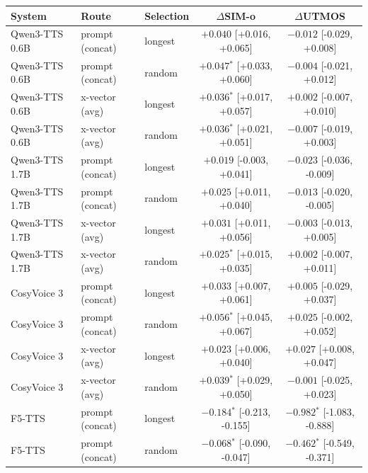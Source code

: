 \begin{tabular}{lllcc}
\toprule
\textbf{System} & \textbf{Route} & \textbf{Selection} & $\Delta$\textbf{SIM-o} & $\Delta$\textbf{UTMOS} \\
\midrule
Qwen3-TTS 0.6B & prompt (concat) & longest & $+0.040$ \scriptsize{[+0.016, +0.065]} & $-0.012$ \scriptsize{[-0.029, +0.008]} \\
Qwen3-TTS 0.6B & prompt (concat) & random & $+0.047$$^\ast$ \scriptsize{[+0.033, +0.060]} & $-0.004$ \scriptsize{[-0.021, +0.012]} \\
Qwen3-TTS 0.6B & x-vector (avg) & longest & $+0.036$$^\ast$ \scriptsize{[+0.017, +0.057]} & $+0.002$ \scriptsize{[-0.007, +0.010]} \\
Qwen3-TTS 0.6B & x-vector (avg) & random & $+0.036$$^\ast$ \scriptsize{[+0.021, +0.051]} & $-0.007$ \scriptsize{[-0.019, +0.003]} \\
Qwen3-TTS 1.7B & prompt (concat) & longest & $+0.019$ \scriptsize{[-0.003, +0.041]} & $-0.023$ \scriptsize{[-0.036, -0.009]} \\
Qwen3-TTS 1.7B & prompt (concat) & random & $+0.025$ \scriptsize{[+0.011, +0.040]} & $-0.013$ \scriptsize{[-0.020, -0.005]} \\
Qwen3-TTS 1.7B & x-vector (avg) & longest & $+0.031$ \scriptsize{[+0.011, +0.056]} & $-0.003$ \scriptsize{[-0.013, +0.005]} \\
Qwen3-TTS 1.7B & x-vector (avg) & random & $+0.025$$^\ast$ \scriptsize{[+0.015, +0.035]} & $+0.002$ \scriptsize{[-0.007, +0.011]} \\
CosyVoice 3 & prompt (concat) & longest & $+0.033$ \scriptsize{[+0.007, +0.061]} & $+0.005$ \scriptsize{[-0.029, +0.037]} \\
CosyVoice 3 & prompt (concat) & random & $+0.056$$^\ast$ \scriptsize{[+0.045, +0.067]} & $+0.025$ \scriptsize{[-0.002, +0.052]} \\
CosyVoice 3 & x-vector (avg) & longest & $+0.023$ \scriptsize{[+0.006, +0.040]} & $+0.027$ \scriptsize{[+0.008, +0.047]} \\
CosyVoice 3 & x-vector (avg) & random & $+0.039$$^\ast$ \scriptsize{[+0.029, +0.050]} & $-0.001$ \scriptsize{[-0.025, +0.023]} \\
F5-TTS & prompt (concat) & longest & $-0.184$$^\ast$ \scriptsize{[-0.213, -0.155]} & $-0.982$$^\ast$ \scriptsize{[-1.083, -0.888]} \\
F5-TTS & prompt (concat) & random & $-0.068$$^\ast$ \scriptsize{[-0.090, -0.047]} & $-0.462$$^\ast$ \scriptsize{[-0.549, -0.371]} \\
\bottomrule
\end{tabular}
